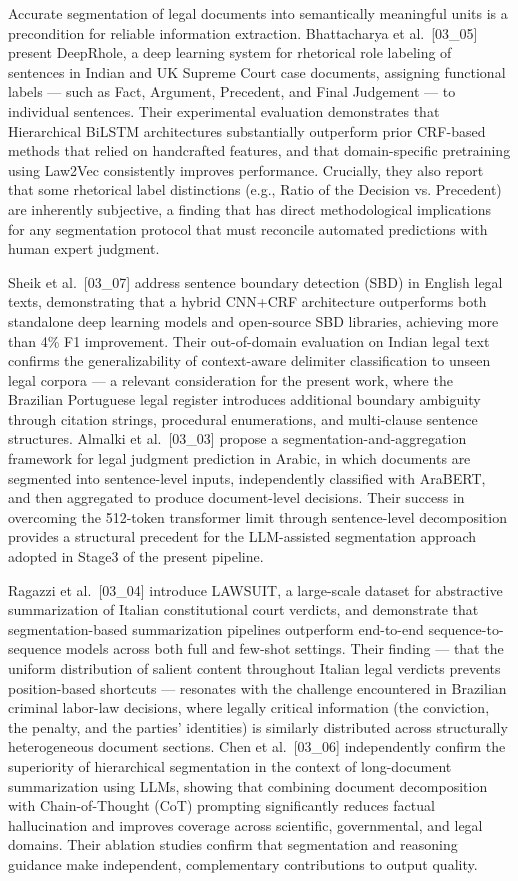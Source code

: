 \documentclass[preprint,a4paper,fleqn]{cas-dc}
\begin{document}
Accurate segmentation of legal documents into semantically meaningful units is a precondition for reliable information extraction. Bhattacharya et al.~[03\_05] present DeepRhole, a deep learning system for rhetorical role labeling of sentences in Indian and UK Supreme Court case documents, assigning functional labels — such as Fact, Argument, Precedent, and Final Judgement — to individual sentences. Their experimental evaluation demonstrates that Hierarchical BiLSTM architectures substantially outperform prior CRF-based methods that relied on handcrafted features, and that domain-specific pretraining using Law2Vec consistently improves performance. Crucially, they also report that some rhetorical label distinctions (e.g., Ratio of the Decision vs. Precedent) are inherently subjective, a finding that has direct methodological implications for any segmentation protocol that must reconcile automated predictions with human expert judgment.

Sheik et al.~[03\_07] address sentence boundary detection (SBD) in English legal texts, demonstrating that a hybrid CNN+CRF architecture outperforms both standalone deep learning models and open-source SBD libraries, achieving more than 4\% F1 improvement. Their out-of-domain evaluation on Indian legal text confirms the generalizability of context-aware delimiter classification to unseen legal corpora — a relevant consideration for the present work, where the Brazilian Portuguese legal register introduces additional boundary ambiguity through citation strings, procedural enumerations, and multi-clause sentence structures. Almalki et al.~[03\_03] propose a segmentation-and-aggregation framework for legal judgment prediction in Arabic, in which documents are segmented into sentence-level inputs, independently classified with AraBERT, and then aggregated to produce document-level decisions. Their success in overcoming the 512-token transformer limit through sentence-level decomposition provides a structural precedent for the LLM-assisted segmentation approach adopted in Stage3 of the present pipeline.

Ragazzi et al.~[03\_04] introduce LAWSUIT, a large-scale dataset for abstractive summarization of Italian constitutional court verdicts, and demonstrate that segmentation-based summarization pipelines outperform end-to-end sequence-to-sequence models across both full and few-shot settings. Their finding — that the uniform distribution of salient content throughout Italian legal verdicts prevents position-based shortcuts — resonates with the challenge encountered in Brazilian criminal labor-law decisions, where legally critical information (the conviction, the penalty, and the parties' identities) is similarly distributed across structurally heterogeneous document sections. Chen et al.~[03\_06] independently confirm the superiority of hierarchical segmentation in the context of long-document summarization using LLMs, showing that combining document decomposition with Chain-of-Thought (CoT) prompting significantly reduces factual hallucination and improves coverage across scientific, governmental, and legal domains. Their ablation studies confirm that segmentation and reasoning guidance make independent, complementary contributions to output quality.
\end{document}
